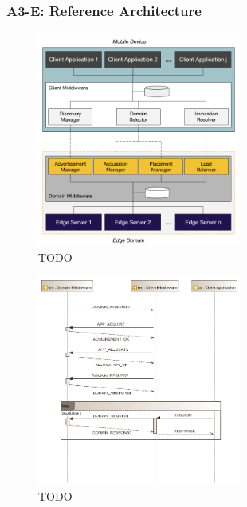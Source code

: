 \subsubsection{A3-E: Reference Architecture}\label{sec:a3-e-reference-architecture}

\begin{figure}
  \includegraphics[width=0.6\textwidth]{figs/reference-architecture.png}
  \caption{TODO}
  \label{fig:reference-architecture}
\end{figure}



\begin{figure}
  \includegraphics[width=0.6\textwidth]{figs/protocols.png}
  \caption{TODO}
  \label{fig:protocols}
\end{figure}
